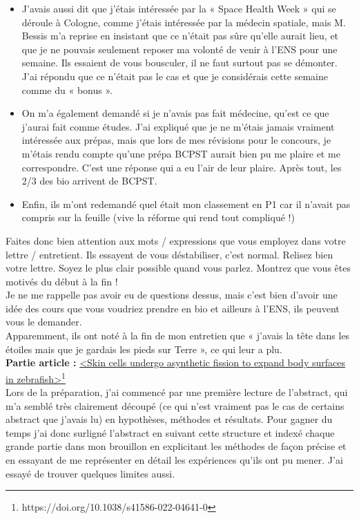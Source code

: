 \begin{itemize}
    \item J’avais aussi dit que j’étais intéressée par la « Space Health Week » qui se déroule à Cologne, comme j’étais intéressée par la médecin spatiale, mais M. Bessis m’a reprise en insistant que ce n’était pas sûre qu’elle aurait lieu, et que je ne pouvais seulement reposer ma volonté de venir à l’ENS pour une semaine. Ils essaient de vous bousculer, il ne faut surtout pas se démonter. J’ai répondu que ce n’était pas le cas et que je considérais cette semaine comme du « bonus ».
    \item On m’a également demandé si je n’avais pas fait médecine, qu’est ce que j’aurai fait comme études. J’ai expliqué que je ne m’étais jamais vraiment intéressée aux prépas, mais que lors de mes révisions pour le concours, je m’étais rendu compte qu'une prépa BCPST aurait bien pu me plaire et me correspondre. C’est une réponse qui a eu l’air de leur plaire. Après tout, les 2/3 des bio arrivent de BCPST.
    \item Enfin, ils m’ont redemandé quel était mon classement en P1 car il n’avait pas compris sur la feuille (vive la réforme qui rend tout compliqué !)
\end{itemize}

Faites donc bien attention aux mots / expressions que vous employez dans votre lettre / entretient. Ils essayent de vous déstabiliser, c’est normal. Relisez bien votre lettre. Soyez le plus clair possible quand vous parlez. Montrez que vous êtes motivés du début à la fin !\\
Je ne me rappelle pas avoir eu de questions dessus, mais c’est bien d’avoir une idée des cours que vous voudriez prendre en bio et ailleurs à l’ENS, ils peuvent vous le demander.\\
Apparemment, ils ont noté à la fin de mon entretien que « j’avais la tête dans les étoiles mais que je gardais les pieds sur Terre », ce qui leur a plu.\\


\lettrine{{\color{yellow!80!black} \oldpilcrowfive}}{}
\textbf{Partie article :} \href{https://doi.org/10.1038/s41586-022-04641-0}{<Skin cells undergo asynthetic fission to expand body surfaces in zebrafish>}\footnote{https://doi.org/10.1038/s41586-022-04641-0}\\

Lors de la préparation, j’ai commencé par une première lecture de l’abstract, qui m’a semblé très clairement découpé (ce qui n’est vraiment pas le cas de certains abstract que j’avais lu) en hypothèses, méthodes et résultats. Pour gagner du temps j’ai donc surligné l’abstract en suivant cette structure et indexé chaque grande partie dans mon brouillon en explicitant les méthodes de façon précise et en essayant de me représenter en détail les expériences qu’ils ont pu mener. J’ai essayé de trouver quelques limites aussi. 

